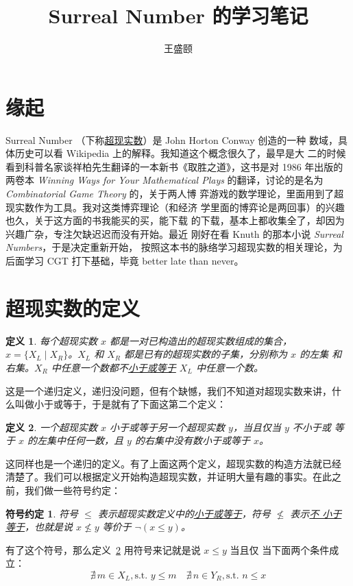 \documentclass[cs4size,a4paper,adobefonts]{ctexart}
\newtheorem{defn}{定义}
\newcommand{\pname}[1]{\underline{#1}}
\begin{document}
\title{\bfseries Surreal Number 的学习笔记}
\author{王盛颐}
\date{}
\maketitle
\section{缘起}

Surreal Number （下称\pname{超现实数}）是 John Horton Conway 创造的一种
数域，具体历史可以看 Wikipedia 上的解释。我知道这个概念很久了，最早是大
二的时候看到科普名家谈祥柏先生翻译的一本新书《取胜之道》，这书是对
1986 年出版的两卷本 \textit{Winning Ways for Your Mathematical Plays}
的翻译，讨论的是名为 \textit{Combinatorial Game Theory} 的，关于两人博
弈游戏的数学理论，里面用到了超现实数作为工具。我对这类博弈理论（和经济
  学里面的博弈论是两回事）的兴趣也久，关于这方面的书我能买的买，能下载
的下载，基本上都收集全了，却因为兴趣广杂，专注欠缺迟迟而没有开始。最近
刚好在看 Knuth 的那本小说 \textit{Surreal Numbers}，于是决定重新开始，
按照这本书的脉络学习超现实数的相关理论，为后面学习 CGT 打下基础，毕竟
better late than never。

\section{超现实数的定义}
\begin{defn}
  \label{defnSurreal}
  每个超现实数 $x$ 都是一对已构造出的超现实数组成的集合，$x=\{X_L \mid
  X_R\}$。$X_L$ 和 $X_R$ 都是已有的超现实数的子集，分别称为 $x$ 的左集
  和右集。$X_R$ 中任意一个数都不\pname{小于或等于} $X_L$ 中任意一个数。
\end{defn}

这是一个递归定义，递归没问题，但有个缺憾，我们不知道对超现实数来讲，什
么叫做小于或等于，于是就有了下面这第二个定义：

\begin{defn}
  \label{defnLeq}
  一个超现实数 $x$ 小于或等于另一个超现实数 $y$，当且仅当 $y$ 不小于或
  等于 $x$ 的左集中任何一数，且 $y$ 的右集中没有数小于或等于 $x$。
\end{defn}

这同样也是一个递归的定义。有了上面这两个定义，超现实数的构造方法就已经
清楚了。我们可以根据定义开始构造超现实数，并证明大量有趣的事实。在此之
前，我们做一些符号约定：
\newtheorem*{symbolDef}{符号约定}
\begin{symbolDef}
  符号 $\leq$ 表示超现实数定义中的\pname{小于或等于}，符号 $\nleq$ 表示\pname{不
  小于等于}，也就是说 $x \nleq y$ 等价于 $\neg(x \leq y)$。
\end{symbolDef}

有了这个符号，那么定义~\ref{defnLeq} 用符号来记就是说 $x \leq y$ 当且仅
当下面两个条件成立：
$$
\nexists\, m \in X_L, \text{s.t. }y \leq m \quad
\nexists\, n \in Y_R, \text{s.t. }n \leq x
$$ 
\end{document}
